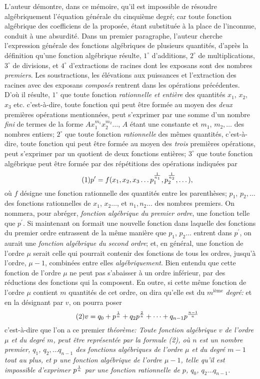 \documentclass[oneside, 12 pt, leqno]{memoir}
\let\oldfrac\frac
\def\frac#1#2{\mathchoice{\text{\scalebox{.83}{${\oldfrac{#1}{#2}}$}}}{\text{\scalebox{.83}{${\displaystyle\oldfrac{#1}{#2}}$}}}{\genfrac{}{}{}{2}{#1}{#2}}{\genfrac{}{}{}{3}{#1}{#2}}}
\begin{document}
L'auteur démontre, dans ce mémoire, qu’il est impossible de résoudre algébriquement l'équation générale du cinquième degré; car toute fonction algébrique des coefficiens de la proposée, étant substituée à la place de l'inconnue, conduit à une absurdité. Dans un premier paragraphe, l'auteur cherche l'expression générale des fonctions algébriques de plusieurs quantités, d'après la définition qu'une fonction algébrique résulte, \(1^{\circ}\) d'additions, \(2^{\circ}\) de multiplications, \(3^{\circ}\) de divisions, et \(4^{\circ}\) d'extractions de racines dont les exposans sont des nombres \textit{premiers}. Les soustractions, les élévations aux puissances et l'extraction des racines avec des exposans \textit{composés} rentrent dans les opérations précédentes. D’où il résulte, \(1^{\circ}\) que toute fonction \textit{rationnelle et entière} des quantités \(x_1\), \(x_2\), \(x_3\) etc. c'est-à-dire, toute fonction qui peut être formée au moyen des \textit{deux} premières opérations mentionnées, peut s'exprimer par une somme d'un nombre \textit{fini} de termes de la forme \(A x_1^{m_1} x_2^{m_2}\dots\), \(A\) étant une constante et \(m_1\), \(m_2, \dots\) des nombres entiers; \(2^{\circ}\) que toute fonction \textit{rationnelle} des mêmes quantités, c'est-à-dire, toute fonction qui peut être formée au moyen des \textit{trois} premières opérations, peut s'exprimer par un quotient de deux fonctions entières;  \(3^{\circ}\) que toute fonction algébrique peut être formée par des répétitions des opérations indiquées par
\[\tag{1} p^{\prime}=f (x_1, x_2, x_3 \dots p_1^{\frac{1}{n_1}}, p_2^{\frac{1}{n_2}}, \dots),\]
où \(f\) désigne une fonction rationnelle des quantités entre les parenthèses; \(p_1\), \(p_2, \dots\) des fonctions rationnelles de \(x_1\), \(x_2 \dots\), et \(n_1, n_2 \dots\) des nombres premiers. On nommera, pour abréger, \textit{fonction algébrique du premier ordre}, une fonction telle que \(p^{\prime}\). Si maintenant on formait une nouvelle fonction dans laquelle des fonctions du premier ordre entrassent de la même manière que \(p_1\), \(p_2 \dots\) entrent dans \(p^{\prime}\), on aurait une \textit{fonction algébrique du second ordre}; et, en général, une fonction de l'ordre \(\mu\) serait celle qui pourrait contenir des fonctions de tous les ordres, jusqu'à l'ordre, \(\mu-1\), combinées entre elles \textit{algébriquement}. Bien entendu que cette fonction de l'ordre \(\mu\) ne peut pas s'abaisser à un ordre inférieur, par des réductions des fonctions qui la composent.  En outre, si cette même fonction de l'ordre \(\mu\) contient \(m\) quantités de cet ordre, on dira qu'elle est du \textit{\(m^{\text{ième}}\) degré:} et en la désignant par \(v\), on pourra poser
\[\tag{2} v=q_0+p^{\frac{1}{n}}+q_2 p^{\frac{2}{n}}+\dots+q_{n-1} p^{\frac{n-1}{n}}\]
c'est-à-dire que l'on a ce premier \textit{théorème: Toute fonction algébrique \(v\) de l'ordre \(\mu\) et du degré \(m\), peut être représentée par la formule (2), où \(n\) est un nombre premier, \(q_1\), \(q_2, \dots q_{n-1}\) des fonctions algébriques de l'ordre \(\mu\) et du degré \(m-1\) tout au plus, et \(p\) une fonction algébrique de l'ordre \(\mu-1\), telle qu'il est impossible d'exprimer \(p^{\frac{1}{n}}\) par une fonction rationnelle de \(p\), \(q_0\), \(q_2 \dots q_{n-1}\).}
\end{document}
